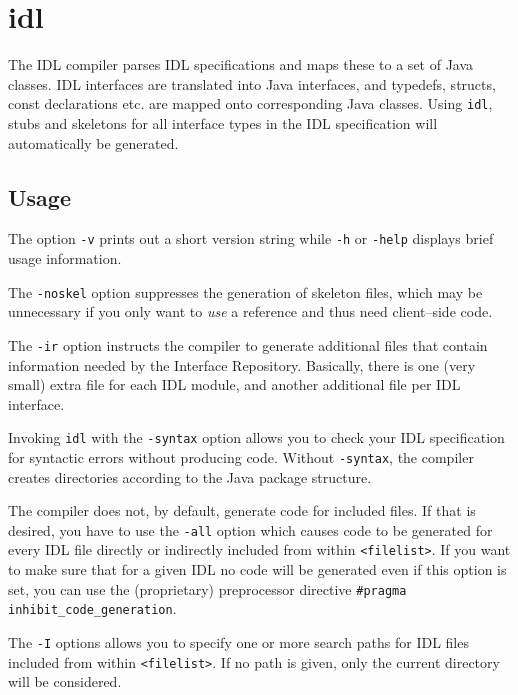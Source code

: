 \documentclass[12pt]{scrbook}
\begin{document}
\section{idl}

The IDL compiler parses IDL specifications  and maps these to a set of
Java classes. IDL interfaces  are translated into Java interfaces, and
typedefs,   structs,   const  declarations   etc.   are  mapped   onto
corresponding Java  classes.  Using {\tt idl},  stubs and
skeletons  for  all interface  types  in  the  IDL specification  will
automatically be generated.

\subsection*{Usage}


The option {\tt  -v} prints out a short version  string while {\tt -h}
or {\tt -help} displays brief usage information.

The {\tt -noskel} option suppresses the generation of skeleton files,
which may be unnecessary if you only want to {\em use} a reference and
thus need client--side code.

The  {\tt -ir} option  instructs the  compiler to  generate additional
files   that    contain   information   needed    by   the   Interface
Repository. Basically, there  is one (very small) extra  file for each
IDL module, and another additional file per IDL interface.

Invoking {\tt idl}  with the {\tt -syntax} option  allows you to check
your IDL  specification for  syntactic errors without  producing code.
Without {\tt  -syntax}, the compiler creates  directories according to
the Java package structure. 

The  compiler  does  not,  by  default,  generate  code  for  included
files. If that is desired, you have to use the {\tt -all} option which
causes code to be generated  for every IDL file directly or indirectly
included from within  {\tt <filelist>}. If you want  to make sure that
for a given IDL no code will  be generated even if this option is set,
you  can use  the  (proprietary) preprocessor  directive {\tt \#pragma
inhibit\_code\_generation}.

The {\tt-I} options allows you to specify one or more search paths for
IDL files included from within  {\tt <filelist>}. If no path is given,
only the  current directory will  be considered. 
\end{document}
